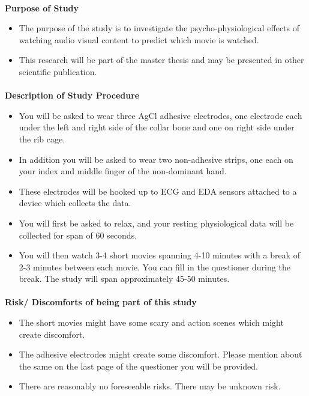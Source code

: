 \documentclass[12pt,fleqn]{scrreprt}
\begin{document}
\paragraph{}
{\large \bf Purpose of Study}
\begin{itemize}
    \item The purpose of the study is to investigate the psycho-physiological effects of watching audio visual content to predict which movie is watched.
    \item This research will be part of the master thesis and may be presented in other scientific publication.
\end{itemize}

\paragraph{}
{\large \bf Description of Study Procedure}
\begin{itemize}
    \item You will be asked to wear three AgCl adhesive electrodes, one electrode each under the left and right side of the collar bone and one on right side under the rib cage.
    \item In addition you will be asked to wear two non-adhesive strips, one each on your index and middle finger of the non-dominant hand.
    \item These electrodes will be hooked up to ECG and EDA sensors attached to a device which collects the data.
    \item You will first be asked to relax, and your resting physiological data will be collected for span of 60 seconds.
    \item You will then watch 3-4 short movies spanning 4-10 minutes with a break of 2-3 minutes between each movie. You can fill in the questioner during the break. The study will span approximately 45-50 minutes.
\end{itemize}

\paragraph{}
{\large \bf Risk/ Discomforts of being part of this study}
\begin{itemize}
    \item The short movies might have some scary and action scenes which might create discomfort.
    \item The adhesive electrodes might create some discomfort. Please mention about the same on the last page of the questioner you will be provided.
    \item There are reasonably no foreseeable risks. There may be unknown risk.
\end{itemize}
\end{document}
